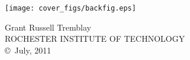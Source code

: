 






\frontmatter

\renewcommand{\thefootnote}{\fnsymbol{footnote}}




\mainmatter

\renewcommand{\thefootnote}{\arabic{footnote}}
\setcounter{footnote}{0}















\backmatter

\renewcommand{\bibsection}{\chapter{References}}





\newpage

\thispagestyle{empty}
\vspace*{1.6in}
\begin{center}
\texttt{[image: cover\_figs/backfig.eps]}

\vspace*{1.8in}
{\sc \normalsize Grant Russell Tremblay}\\
{\footnotesize ROCHESTER INSTITUTE OF TECHNOLOGY} \\
{\small \copyright ~July, 2011}
\end{center}
\vfill





